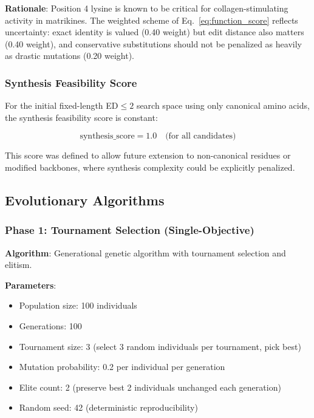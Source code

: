 \documentclass[11pt,letterpaper]{article}
\begin{document}
\textbf{Rationale}: Position 4 lysine is known to be critical for collagen-stimulating activity in matrikines\cite{katayama1993}. The weighted scheme of Eq.~\ref{eq:function_score} reflects uncertainty: exact identity is valued (0.40 weight) but edit distance also matters (0.40 weight), and conservative substitutions should not be penalized as heavily as drastic mutations (0.20 weight).

\subsubsection{Synthesis Feasibility Score}

For the initial fixed-length ED$\leq 2$ search space using only canonical amino acids, the synthesis feasibility score is constant:

\begin{equation}
\text{synthesis\_score} = 1.0 \quad \text{(for all candidates)}
\label{eq:synthesis_score}
\end{equation}

This score was defined to allow future extension to non-canonical residues or modified backbones, where synthesis complexity could be explicitly penalized.

\subsection{Evolutionary Algorithms}

\subsubsection{Phase 1: Tournament Selection (Single-Objective)}

\textbf{Algorithm}: Generational genetic algorithm with tournament selection and elitism.

\textbf{Parameters}:
\begin{itemize}
  \item Population size: 100 individuals
  \item Generations: 100
  \item Tournament size: 3 (select 3 random individuals per tournament, pick best)
  \item Mutation probability: 0.2 per individual per generation
  \item Elite count: 2 (preserve best 2 individuals unchanged each generation)
  \item Random seed: 42 (deterministic reproducibility)
\end{itemize}
\end{document}
